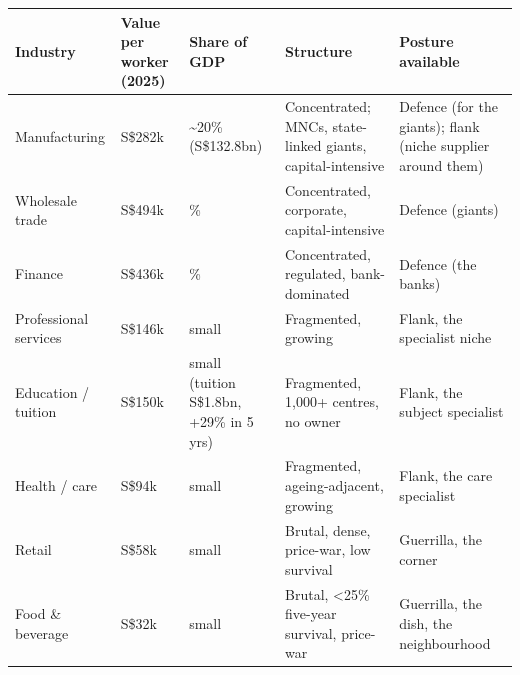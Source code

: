 \documentclass[10pt,twoside,openany]{memoir}
\renewcommand{\arraystretch}{1.1}
\begin{document}
{{\def\LTcaptype{none} %
{\renewcommand{\arraystretch}{0.9}\begin{longtable}[]{@{}
  >{\raggedright\arraybackslash}p{}
  >{\raggedright\arraybackslash}p{}
  >{\raggedright\arraybackslash}p{}
  >{\raggedright\arraybackslash}p{}
  >{\raggedright\arraybackslash}p{}@{}}
\toprule\noalign{}
\begin{minipage}[b]{\linewidth}\raggedright
Industry
\end{minipage} & \begin{minipage}[b]{\linewidth}\raggedright
Value per worker (2025)
\end{minipage} & \begin{minipage}[b]{\linewidth}\raggedright
Share of GDP
\end{minipage} & \begin{minipage}[b]{\linewidth}\raggedright
Structure
\end{minipage} & \begin{minipage}[b]{\linewidth}\raggedright
Posture available
\end{minipage} \\
\midrule\noalign{}
\endhead
\bottomrule\noalign{}
\endlastfoot
Manufacturing & S\$282k & \textasciitilde20\% (S\$132.8bn) &
Concentrated; MNCs, state-linked giants, capital-intensive & Defence
(for the giants); flank (niche supplier around them) \\
Wholesale trade & S\$494k & 18.6\% & Concentrated, corporate,
capital-intensive & Defence (giants) \\
Finance & S\$436k & 13.2\% & Concentrated, regulated, bank-dominated &
Defence (the banks) \\
Professional services & S\$146k & small & Fragmented, growing & Flank,
the specialist niche \\
Education / tuition & S\$150k & small (tuition S\$1.8bn, +29\% in 5 yrs)
& Fragmented, 1,000+ centres, no owner & Flank, the subject
specialist \\
Health / care & S\$94k & small & Fragmented, ageing-adjacent, growing &
Flank, the care specialist \\
Retail & S\$58k & small & Brutal, dense, price-war, low survival &
Guerrilla, the corner \\
Food \& beverage & S\$32k & small & Brutal, \textless25\% five-year
survival, price-war & Guerrilla, the dish, the neighbourhood \\
\end{longtable}
}

}}
\end{document}
